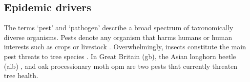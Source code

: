 

\subsection{Epidemic drivers}


The terms `pest' and `pathogen' describe a broad spectrum of taxonomically diverse organisms. 
Pests denote any organism that harms humans or human interests such as crops or livestock
\cite{buckle2015rodent, oerke2006crop, de1964biological}. Overwhelmingly, insects constitute the main
pest threats to tree species \cite{metcalf1994introduction}. In Great Britain (\acrshort{gb}), the Asian longhorn beetle
(\acrshort{alb}) \cite{haack2010managing}, and oak processionary moth \acrshort{opm} \cite{tomlinson2015managing} are two pests that currently threaten tree health.

